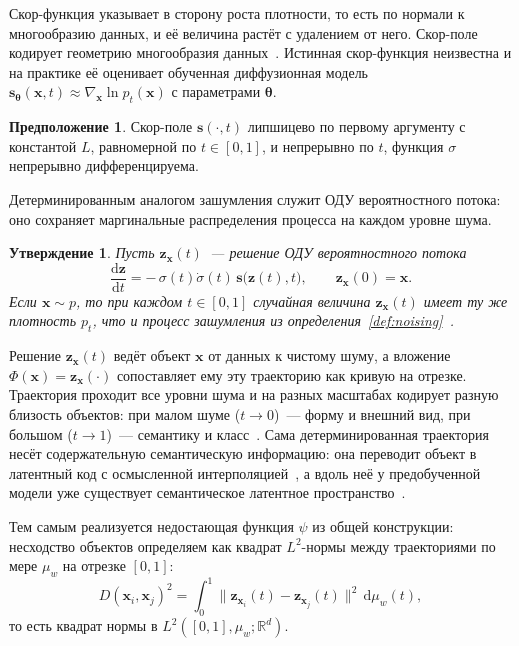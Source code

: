 \documentclass[14pt, a4paper]{extarticle}
\theoremstyle{definition}
\newtheorem{assumption}[definition]{Предположение}
\theoremstyle{plain}
\newtheorem{proposition}[definition]{Утверждение}
\begin{document}
Скор-функция указывает в сторону роста плотности, то есть по нормали к многообразию
данных, и её величина растёт с удалением от него. Скор-поле кодирует
геометрию многообразия данных~\cite{Azeglio2025Inside,Kamkari2024Geometric}.
Истинная скор-функция неизвестна и на практике её оценивает обученная диффузионная
модель $\mathbf{s}_{\boldsymbol{\theta}}(\mathbf{x},t)\approx\nabla_{\mathbf{x}}\ln
p_t(\mathbf{x})$ с параметрами $\boldsymbol{\theta}$.

\begin{assumption}
\label{assum:score}
Скор-поле $\mathbf{s}(\cdot,t)$ липшицево по первому аргументу с константой $L$,
равномерной по $t\in[0,1]$, и непрерывно по $t$, функция $\sigma$ непрерывно
дифференцируема.
\end{assumption}

Детерминированным аналогом зашумления служит ОДУ вероятностного потока: оно
сохраняет маргинальные распределения процесса на каждом уровне шума.

\begin{proposition}
\label{prop:pfode}
Пусть $\mathbf{z}_{\mathbf{x}}(t)$~--- решение ОДУ вероятностного потока
\begin{equation}
    \frac{\mathrm{d}\mathbf{z}}{\mathrm{d}t}
    =-\,\sigma(t)\dot\sigma(t)\,\mathbf{s}\big(\mathbf{z}(t),t\big),
    \qquad \mathbf{z}_{\mathbf{x}}(0)=\mathbf{x}.
    \label{eq:pfode}
\end{equation}
Если $\mathbf{x}\sim p$, то при каждом $t\in[0,1]$ случайная величина
$\mathbf{z}_{\mathbf{x}}(t)$ имеет ту же плотность $p_t$, что и процесс зашумления из
определения~\ref{def:noising}~\cite{Song2021Score}.
\end{proposition}

Решение $\mathbf{z}_{\mathbf{x}}(t)$ ведёт объект $\mathbf{x}$ от данных к чистому
шуму, а вложение $\Phi(\mathbf{x})=\mathbf{z}_{\mathbf{x}}(\cdot)$ сопоставляет ему
эту траекторию как кривую на отрезке. Траектория проходит все уровни
шума и на разных масштабах кодирует разную близость объектов: при малом шуме
($t\to0$)~--- форму и внешний вид, при большом ($t\to1$)~--- семантику и
класс~\cite{Choi2022P2}. Сама детерминированная траектория несёт содержательную
семантическую информацию: она переводит объект в латентный код с осмысленной
интерполяцией~\cite{Song2021DDIM,Preechakul2022DiffAE}, а вдоль неё у предобученной
модели уже существует семантическое латентное
пространство~\cite{Kwon2023SemanticLatent}.

Тем самым реализуется недостающая функция $\psi$ из общей конструкции: несходство
объектов определяем как квадрат $L^2$-нормы между траекториями по мере $\mu_w$ на
отрезке $[0,1]$:
\begin{equation}
    D(\mathbf{x}_i,\mathbf{x}_j)^2
    =\int_0^1\big\|\mathbf{z}_{\mathbf{x}_i}(t)-\mathbf{z}_{\mathbf{x}_j}(t)\big\|^2\,
      \mathrm{d}\mu_w(t),
    \label{eq:distance}
\end{equation}
то есть квадрат нормы в $L^2([0,1],\mu_w;\mathbb{R}^d)$.
\end{document}
